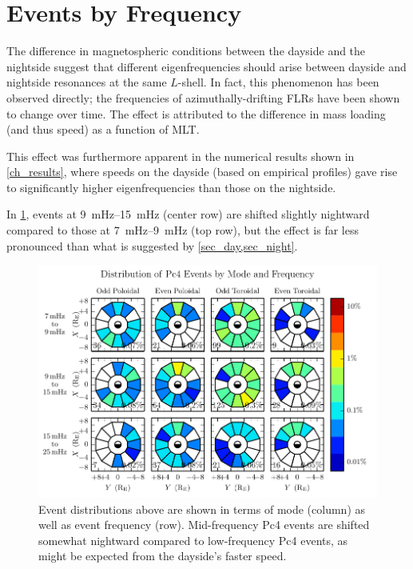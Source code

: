 

\section{Events by Frequency}
  \label{sec_f}

The difference in magnetospheric conditions between the dayside and the
nightside suggest that different eigenfrequencies should arise between dayside
and nightside resonances at the same $L$-shell. In fact, this phenomenon has
been observed directly; the frequencies of azimuthally-drifting FLRs have been
shown to change over time\cite{motoba_2015}. The effect is attributed to the
difference in mass loading (and thus \Alfven speed) as a function of MLT. 

This effect was furthermore apparent in the numerical results shown in
\cref{ch_results}, where \Alfven speeds on the dayside (based on empirical
profiles) gave rise to significantly higher eigenfrequencies than those on the
nightside. 

In \cref{fig_mode_f}, events at \SIrange{9}{15}{\mHz} (center row) are shifted
slightly nightward compared to those at \SIrange{7}{9}{\mHz} (top row), but
the effect is far less pronounced than what is suggested by
\cref{sec_day,sec_night}. 

\begin{figure}[!htb]
  \centering
  \includegraphics[width=\textwidth]{figures/mode_f.pdf}
  \caption[Rate of Pc4 Events by Mode and Frequency]{
    Event distributions above are shown in terms of mode (column) as well as
    event frequency (row). Mid-frequency Pc4 events are shifted somewhat
    nightward
    compared to low-frequency Pc4 events, as might be expected from the
    dayside's faster \Alfven speed. 
  }
  \label{fig_mode_f}
\end{figure}


